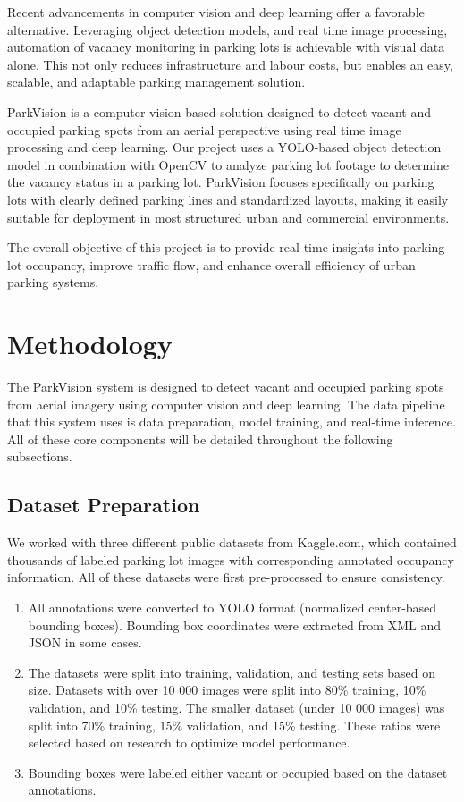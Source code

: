 \documentclass[12pt, letterpaper, oneside]{article}
\begin{document}
Recent advancements in computer vision and deep learning offer a favorable alternative. Leveraging object detection models, and real time image processing, automation of vacancy monitoring in parking lots is achievable with visual data alone. This not only reduces infrastructure and labour costs, but enables an easy, scalable, and adaptable parking management solution.

ParkVision is a computer vision-based solution designed to detect vacant and occupied parking spots from an aerial perspective using real time image processing and deep learning. Our project uses a YOLO-based object detection model in combination with OpenCV to analyze parking lot footage to determine the vacancy status in a parking lot. ParkVision focuses specifically on parking lots with clearly defined parking lines and standardized layouts, making it easily suitable for deployment in most structured urban and commercial environments.

The overall objective of this project is to provide real-time insights into parking lot occupancy, improve traffic flow, and enhance overall efficiency of urban parking systems.

\section{Methodology}
\label{sec:methodology}
The ParkVision system is designed to detect vacant and occupied parking spots from aerial imagery using computer vision and deep learning. The data pipeline that this system uses is data preparation, model training, and real-time inference. All of these core components will be detailed throughout the following subsections.


\subsection{Dataset Preparation}

We worked with three different public datasets from Kaggle.com, which contained thousands of labeled parking lot images with corresponding annotated occupancy information. All of these datasets were first pre-processed to ensure consistency.

\begin{enumerate}
    \item All annotations were converted to YOLO format (normalized center-based bounding boxes). Bounding box coordinates were extracted from XML and JSON in some cases.

    \item The datasets were split into training, validation, and testing sets based on size. Datasets with over 10 000 images were split into 80\% training, 10\% validation, and 10\% testing. The smaller dataset (under 10 000 images) was split into 70\% training, 15\% validation, and 15\% testing. These ratios were selected based on research to optimize model performance.

    \item Bounding boxes were labeled either vacant or occupied based on the dataset annotations.
    
\end{enumerate}
\end{document}
